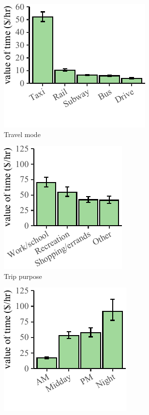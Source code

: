\documentclass[numbered]{trbunofficial}\usepackage[]{graphicx}\usepackage[]{color}
\makeatletter
\def\maxwidth{ %
  \ifdim\Gin@nat@width>\linewidth
    \linewidth
  \else
    \Gin@nat@width
  \fi
}
\newenvironment{knitrout}{}{} %
\makeatother
\begin{document}
\begin{figure}[!h]
  \centering
  \begin{subfigure}[t]{0.3\textwidth}
\begin{knitrout}
\color{fgcolor}
\includegraphics[width=\maxwidth]{figure/plot_votmode-1} 

\end{knitrout}
	  \caption{\centering Travel mode}
	  \label{fig:votmode}
	\end{subfigure}
	\begin{subfigure}[t]{0.26\textwidth}
\begin{knitrout}
\color{fgcolor}
\includegraphics[width=\maxwidth]{figure/plot_votpurpose-1} 

\end{knitrout}
    \caption{\centering Trip purpose}
	  \label{fig:votpurpose}
  \end{subfigure}
  \begin{subfigure}[t]{0.26\textwidth}
\begin{knitrout}
\color{fgcolor}
\includegraphics[width=\maxwidth]{figure/plot_vottod-1} 


\end{knitrout}
\end{subfigure}
\end{figure}
\end{document}
